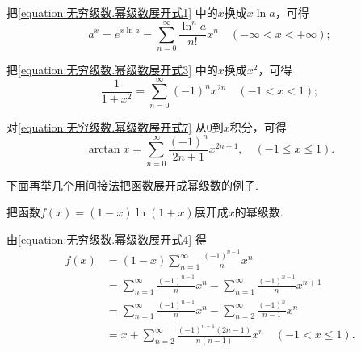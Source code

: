 把\cref{equation:无穷级数.幂级数展开式1} 中的\(x\)换成\(x \ln a\)，可得
\begin{equation}\label{equation:无穷级数.幂级数展开式6}
a^x = e^{x \ln a} = \sum\limits_{n=0}^{\infty} \frac{\ln^n a}{n!} x^n
\quad (-\infty<x<+\infty);
\end{equation}

把\cref{equation:无穷级数.幂级数展开式3} 中的\(x\)换成\(x^2\)，可得
\begin{equation}\label{equation:无穷级数.幂级数展开式7}
\frac{1}{1+x^2} = \sum\limits_{n=0}^{\infty} (-1)^n x^{2n}
\quad (-1<x<1);
\end{equation}

对\cref{equation:无穷级数.幂级数展开式7} 从\(0\)到\(x\)积分，可得\begin{equation}
\arctan x = \sum\limits_{n=0}^{\infty} \frac{(-1)^n}{2n+1} x^{2n+1},
\quad (-1 \leqslant x \leqslant 1).
\end{equation}

下面再举几个用间接法把函数展开成幂级数的例子.

\begin{example}
把函数\(f(x) = (1-x) \ln(1+x)\)展开成\(x\)的幂级数.
\begin{solution}
由\cref{equation:无穷级数.幂级数展开式4} 得\[
\begin{split}
f(x) &= (1-x) \sum\limits_{n=1}^{\infty} \frac{(-1)^{n-1}}{n} x^n \\
&= \sum\limits_{n=1}^{\infty} \frac{(-1)^{n-1}}{n} x^n
	- \sum\limits_{n=1}^{\infty} \frac{(-1)^{n-1}}{n} x^{n+1} \\
&= \sum\limits_{n=1}^{\infty} \frac{(-1)^{n-1}}{n} x^n
	- \sum\limits_{n=2}^{\infty} \frac{(-1)^n}{n-1} x^n \\
&= x + \sum\limits_{n=2}^{\infty} \frac{(-1)^{n-1} (2n-1)}{n(n-1)} x^n
\quad (-1 < x \leqslant 1).
\end{split}
\]
\end{solution}
\end{example}

